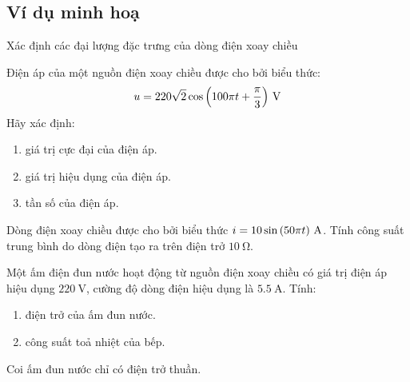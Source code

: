 \subsection{Ví dụ minh hoạ}
\begin{dang}{Xác định các đại lượng đặc trưng của dòng điện xoay chiều}
	\end{dang}
\begin{vd}
Điện áp của một nguồn điện xoay chiều được cho bởi biểu thức: 
$$\xsi{u=220\sqrt{2}\cos\left(100\pi t+\dfrac{\pi}{3}\right)}{\volt}$$
Hãy xác định:
\begin{enumerate}[label=\alph*)]
	\item giá trị cực đại của điện áp.
	\item giá trị hiệu dụng của điện áp.
	\item tần số của điện áp.
\end{enumerate}
\end{vd}
\begin{vd}
Dòng điện xoay chiều được cho bởi biểu thức $i=\xsi{10\sin\left(50\pi t\right)}{\ampere}$. Tính công suất trung bình do dòng điện  tạo ra trên điện trở $\SI{10}{\ohm}$.
\end{vd}
\begin{vd}
Một ấm điện đun nước hoạt động từ nguồn điện xoay chiều có giá trị điện áp hiệu dụng $\SI{220}{\volt}$, cường độ dòng điện hiệu dụng là $\SI{5.5}{\ampere}$. Tính: 
\begin{enumerate}[label=\alph*)]
	\item điện trở của ấm đun nước.
	\item công suất toả nhiệt của bếp.
\end{enumerate}
Coi ấm đun nước chỉ có điện trở thuần.
\end{vd}
